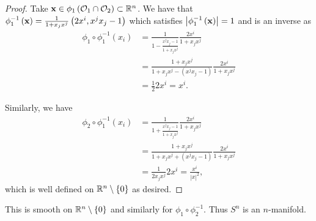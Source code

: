 \begin{examples}
\begin{enumerate}[label=\roman*)]
\begin{proof}
    Take $\vb{x} \in \phi_1 \left( \mathcal{O}_1 \cap \mathcal{O}_2 \right) \subset \mathbb{R}^{n} $. We have that $\phi_1^{-1} \left( \vb{x} \right) = \frac{1}{1 + x_{j} x^{j}} \left( 2x^{i},x^{j} x_{j} - 1\right)  $ which satisfies $\left| \phi_1^{-1} \left( \vb{x} \right)  \right| = 1$ and is an inverse as
    \begin{align}
        \phi_1 \circ \phi_1^{-1}\left( x_{i} \right) &= \frac{1}{1 - \frac{x^{j} x_{j} - 1}{1 + x_{j} x^{j}}} \frac{2x^{i}}{1 + x_{j} x^{j}} \\
        &= \frac{1 + x_{j} x^{j}}{1 + x_{j} x^{j} - \left( x^{j}x_{j} - 1 \right) } \frac{2x^{i}}{1 + x_{j} x^{j}} \\
        &= \frac{1}{2} 2x^{i} = x^{i}
    .\end{align}

    Similarly, we have
    \begin{align}
        \phi_2 \circ \phi_1^{-1} \left( x_{i} \right)  &= \frac{1}{1 + \frac{x^{j} x_{j} - 1}{1 + x_{j} x^{j}}} \frac{2x^{i}}{1 + x_{j} x^{j}} \\
        &= \frac{1 + x_{j} x^{j}}{1 + x_{j} x^{j} + \left( x^{j} x_{j} - 1 \right) }  \frac{2x^{i}}{1 + x_{j} x^{j}}\\
        &= \frac{1}{2x_{j} x^{j}} 2x^{i} = \frac{x^{i}}{\left| x \right|^2}
    ,\end{align}
    which is well defined on $\mathbb{R}^{n} \setminus \{0\} $ as desired.
\end{proof}

This is smooth on $\mathbb{R}^{n} \setminus \{0\} $ and similarly for $\phi_1 \circ \phi_2^{-1}$. Thus $S^{n}$ is an $n$-manifold.
    \end{enumerate}
\end{examples}


